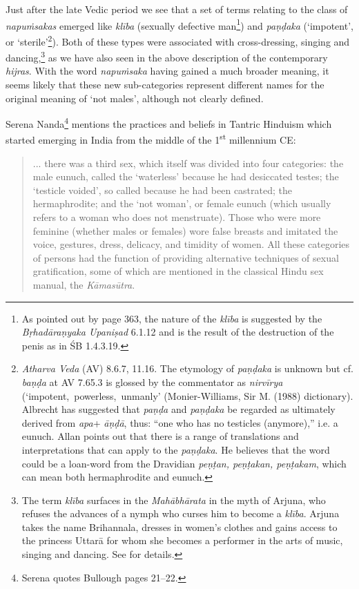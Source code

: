 Just after the late Vedic period we see that a set of terms relating to the class of {\em napuṁsakas} emerged like {\em klība} (sexually defective man\footnote{As pointed out by \cite{zwilling} page 363, the nature of the {\em klība} is suggested by the {\em Bṛhadāraṇyaka Upaniṣad} 6.1.12 and is the result of the destruction of the penis as in ŚB 1.4.3.19.}) and {\em paṇḍaka} (`impotent', or `sterile'\footnote{{\em Atharva Veda} (AV) 8.6.7, 11.16. The etymology of {\em paṇḍaka} is unknown but cf. {\em baṇḍa} at AV 7.65.3 is glossed by the commentator as {\em nirvīrya} (`impotent, powerless, unmanly' (Monier-Williams, Sir M. (1988) dictionary). Albrecht \cite{wezler} has suggested that {\em paṇḍa} and {\em paṇḍaka} be regarded as ultimately derived from {\em *apa}+ {\em āṇḍā}, thus: “one who has no testicles (anymore),” i.e. a eunuch. Allan \cite{bomhard} points out that there is a range of translations and interpretations that can apply to the {\em paṇḍaka}. He believes that the word could be a loan-word from the Dravidian {\em peṇṭan, peṇṭakan, peṇṭakam}, which can mean both hermaphrodite and eunuch.}). Both of these types were associated with cross-dressing, singing and dancing,\footnote{The term {\em klība} surfaces in the {\em Mahābhārata} in the myth of Arjuna, who refuses the advances of a nymph who curses him to become a {\em klība}. Arjuna takes the name Brihannala, dresses in women's clothes and gains access to the princess Uttarā for whom she becomes a performer in the arts of music, singing and dancing. See \cite{cassell} for details.} as we have also seen in the above description of the contemporary {\em hijras}. With the word {\em napuṁsaka} having gained a much broader meaning, it seems likely that these new sub-categories represent different names for the original meaning of `not males', although not clearly defined.

Serena Nanda\footnote{Serena \cite{nanda} quotes Bullough pages 21–22.} mentions the practices and beliefs in Tantric Hinduism which started emerging in India from the middle of the 1\textsuperscript{st} millennium CE:

\begin{quote}
... there was a third sex, which itself was divided into four categories: the male eunuch, called the `waterless' because he had desiccated testes; the `testicle voided', so called because he had been castrated; the hermaphrodite; and the `not woman', or female eunuch (which usually refers to a woman who does not menstruate). Those who were more feminine (whether males or females) wore false breasts and imitated the voice, gestures, dress, delicacy, and timidity of women. All these categories of persons had the function of providing alternative techniques of sexual gratification, some of which are mentioned in the classical Hindu sex manual, the {\em Kāmasūtra}.
\end{quote}

